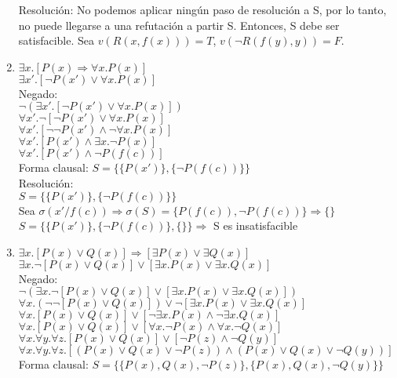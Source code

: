 \documentclass[10pt,a4paper]{article}
\begin{document}
\begin{enumerate}
Resolución: No podemos aplicar ningún paso de resolución a S, por lo tanto, no puede llegarse a una refutación a partir S. Entonces, S debe ser satisfacible. Sea $v(R(x,f(x)))=T$, $v(\neg R(f(y),y))=F$.
\item
$\exists x. [P(x) \Rightarrow \forall x. P(x)]$ \\
$\exists x'. [\neg P(x') \vee \forall x. P(x)]$ \\
Negado: \\
$\neg (\exists x'. [\neg P(x') \vee \forall x. P(x)])$ \\
$ \forall x'. \neg [\neg P(x') \vee \forall x. P(x)]$ \\
$ \forall x'. [ \neg \neg P(x') \wedge \neg \forall x. P(x)]$ \\
$ \forall x'. [ P(x') \wedge \exists x. \neg P(x)]$ \\
$ \forall x'. [ P(x') \wedge \neg P(f(c))]$ \\
Forma clausal: $S=\{ \{ P(x') \} , \{ \neg P(f(c)) \} \}$ \\
Resolución: \\
$S=\{ \{P(x')\}, \{\neg P(f(c))\}\}$\\
Sea $\sigma(x' / f(c)) \Rightarrow \sigma(S)=\{ P(f(c)), \neg P(f(c))\} \Rightarrow \{\}$ \\
$S=\{ \{P(x')\}, \{\neg P(f(c))\}, \{\} \} \Rightarrow $ S es insatisfacible
\item
$ \exists x. [P(x) \vee Q(x)] \Rightarrow [\exists P(x) \vee \exists Q(x)]$ \\
$ \exists x. \neg [P(x) \vee Q(x)] \vee [\exists x. P(x) \vee \exists x. Q(x)]$ \\
Negado: \\
$ \neg (\exists x. \neg [P(x) \vee Q(x)] \vee [\exists x. P(x) \vee \exists x. Q(x)])$ \\
$ \forall x. (\neg \neg [P(x) \vee Q(x)]) \vee \neg [\exists x. P(x) \vee \exists x. Q(x)]$ \\
$ \forall x. [P(x) \vee Q(x)] \vee [\neg \exists x. P(x) \wedge \neg \exists x. Q(x)]$ \\
$ \forall x. [P(x) \vee Q(x)] \vee [\forall x. \neg P(x) \wedge \forall x. \neg Q(x)]$ \\
$ \forall x. \forall y. \forall z. [P(x) \vee Q(x)] \vee [\neg P(z) \wedge \neg Q(y)]$ \\
$ \forall x. \forall y. \forall z. [(P(x) \vee Q(x) \vee \neg P(z)) \wedge (P(x) \vee Q(x) \vee \neg Q(y))]$ \\
Forma clausal: $S=\{\{P(x), Q(x), \neg P(z)\}, \{P(x), Q(x), \neg Q(y)\}\}$ \\

\end{enumerate}
\end{document}
